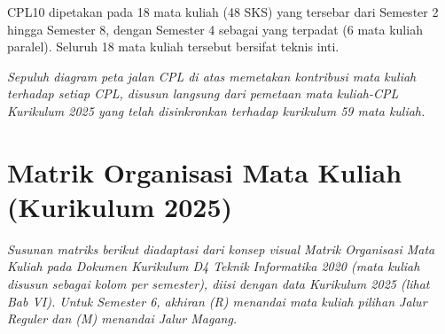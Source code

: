 CPL10 dipetakan pada 18 mata kuliah (48 SKS) yang tersebar dari Semester 2 hingga Semester 8, dengan Semester 4 sebagai yang terpadat (6 mata kuliah paralel). Seluruh 18 mata kuliah tersebut bersifat teknis inti.

\textit{Sepuluh diagram peta jalan CPL di atas memetakan kontribusi mata kuliah terhadap setiap CPL, disusun langsung dari pemetaan mata kuliah-CPL Kurikulum 2025 yang telah disinkronkan terhadap kurikulum 59 mata kuliah.}

\section{Matrik Organisasi Mata Kuliah (Kurikulum 2025)}

\textit{Susunan matriks berikut diadaptasi dari konsep visual Matrik Organisasi Mata Kuliah pada Dokumen Kurikulum D4 Teknik Informatika 2020 (mata kuliah disusun sebagai kolom per semester), diisi dengan data Kurikulum 2025 (lihat Bab VI). Untuk Semester 6, akhiran (R) menandai mata kuliah pilihan Jalur Reguler dan (M) menandai Jalur Magang.}


